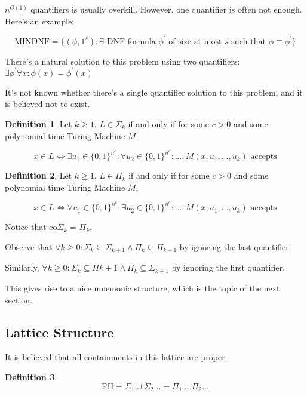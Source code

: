 \documentclass{article}
\theoremstyle{definition}
\newtheorem{definition}{Definition}
\begin{document}
$n^{O(1)}$ quantifiers is usually overkill. However, one quantifier is often not enough. Here's an example:

\[ \text{MINDNF} = \{ (\phi, 1^{s}) : \exists \text{ DNF formula } \phi^{\prime} \text{ of size at most } s \text{ such that } \phi \equiv \phi^{\prime} \}\]

There's a natural solution to this problem using two quantifiers: $\exists \phi^{\prime} \forall x: \phi(x) = \phi^{\prime}(x)$

It's not known whether there's a single quantifier solution to this problem, and it is believed not to exist.

\begin{definition}
    Let $k \geq 1$. $L \in \Sigma_{k}$ if and only if for some $c > 0$ and some polynomial time Turing Machine $M$,

    \[ x \in L \iff \exists u_{1} \in \{0,1\}^{n^{c}}: \forall u_{2} \in \{0,1\}^{n^{c}}: ...: M(x,u_{1},...,u_{k}) \text{ accepts}  \]
\end{definition}

\begin{definition}
    Let $k \geq 1$. $L \in \Pi_{k}$ if and only if for some $c > 0$ and some polynomial time Turing Machine $M$,

    \[ x \in L \iff \forall u_{1} \in \{0,1\}^{n^{c}}: \exists u_{2} \in \{0,1\}^{n^{c}}: ...: M(x,u_{1},...,u_{k}) \text{ accepts}  \]
\end{definition}

Notice that co$\Sigma_{k}$ = $\Pi_{k}$.

Observe that $\forall k \geq 0: \Sigma_{k} \subseteq \Sigma_{k+1} \land \Pi_{k} \subseteq \Pi_{k+1}$ by ignoring the last quantifier.

Similarly,  $\forall k \geq 0: \Sigma_{k} \subseteq \Pi{k+1} \land \Pi_{k} \subseteq \Sigma_{k+1}$ by ignoring the first quantifier.

This gives rise to a nice mnemonic structure, which is the topic of the next section.

\subsection{Lattice Structure}

It is believed that all containments in this lattice are proper. 

\begin{definition}
    \[ \text{PH} = \Sigma_{1} \cup \Sigma_{2} ... = \Pi_{1} \cup \Pi_{2} ...\]
\end{definition}
\end{document}
